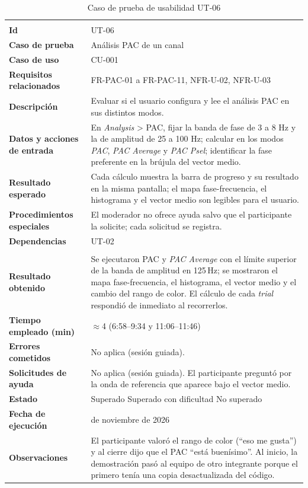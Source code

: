 \documentclass[12pt,letterpaper,oneside]{article}
\DeclareRobustCommand{\_}{\textunderscore\allowbreak}
\newcommand{\fechasesion}{11 de noviembre de 2026}
\newcommand{\casilla}[1]{%
    \fbox{\makebox[1em][c]{#1}}%
}
\begin{document}
\begin{center}
\small
\begin{longtable}{|>{\raggedright\arraybackslash}p{}|>{\raggedright\arraybackslash}p{}|}
\hline
\endfirsthead
\hline
\endhead
\hline
\endfoot
\hline
\caption{Caso de prueba de usabilidad UT-06} \label{tab:ut-06} \\
\endlastfoot
\textbf{Id} & UT-06 \\
\hline
\textbf{Caso de prueba} & Análisis PAC de un canal \\
\hline
\textbf{Caso de uso} & CU-001 \\
\hline
\textbf{Requisitos relacionados} & FR-PAC-01 a FR-PAC-11, NFR-U-02, NFR-U-03 \\
\hline
\textbf{Descripción} & Evaluar si el usuario configura y lee el análisis PAC en sus distintos modos. \\
\hline
\textbf{Datos y acciones de entrada} & En \textit{Analysis} > PAC, fijar la banda de fase de 3 a 8 Hz y la de amplitud de 25 a 100 Hz; calcular en los modos \textit{PAC}, \textit{PAC Average} y \textit{PAC Psel}; identificar la fase preferente en la brújula del vector medio. \\
\hline
\textbf{Resultado esperado} & Cada cálculo muestra la barra de progreso y su resultado en la misma pantalla; el mapa fase-frecuencia, el histograma y el vector medio son legibles para el usuario. \\
\hline
\textbf{Procedimientos especiales} & El moderador no ofrece ayuda salvo que el participante la solicite; cada solicitud se registra. \\
\hline
\textbf{Dependencias} & UT-02 \\
\hline
\multicolumn{2}{|c|}{\textbf{Información para el seguimiento}} \\
\hline
\textbf{Resultado obtenido} & Se ejecutaron PAC y \textit{PAC Average} con el límite superior de la banda de amplitud en 125\,Hz; se mostraron el mapa fase-frecuencia, el histograma, el vector medio y el cambio del rango de color. El cálculo de cada \textit{trial} respondió de inmediato al recorrerlos. \\
\hline
\textbf{Tiempo empleado (min)} & $\approx$4 (6:58--9:34 y 11:06--11:46) \\
\hline
\textbf{Errores cometidos} & No aplica (sesión guiada). \\
\hline
\textbf{Solicitudes de ayuda} & No aplica (sesión guiada). El participante preguntó por la onda de referencia que aparece bajo el vector medio. \\
\hline
\textbf{Estado} & \casilla{x} Superado \qquad \casilla{} Superado con dificultad \qquad \casilla{} No superado \\
\hline
\textbf{Fecha de ejecución} & \fechasesion \\
\hline
\textbf{Observaciones} & El participante valoró el rango de color (``eso me gusta'') y al cierre dijo que el PAC ``está buenísimo''. Al inicio, la demostración pasó al equipo de otro integrante porque el primero tenía una copia desactualizada del código. \\
\hline
\end{longtable}
\end{center}
\end{document}
